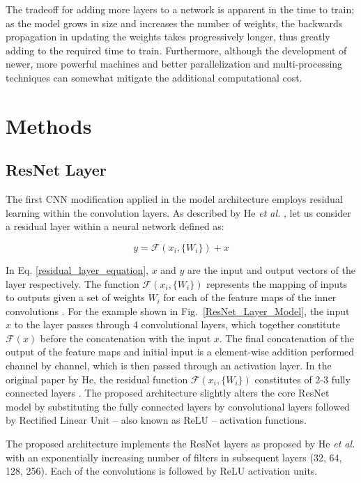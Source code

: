 \documentclass[conference]{IEEEtran}
\begin{document}
The tradeoff for adding more layers to a network is apparent in the time to train; as the model grows in size and increases the number of weights, the backwards propagation in updating the weights takes progressively longer, thus greatly adding to the required time to train. Furthermore, although the development of newer, more powerful machines and better parallelization and multi-processing techniques can somewhat mitigate the additional computational cost.
\section{Methods}
\subsection{ResNet Layer}
The first CNN modification applied in the model architecture employs residual learning within the convolution layers. As described by He \textit{et al.} \cite{He2016}, let us consider a residual layer within a neural network defined as:

\begin{equation}
y = \mathcal{F} \left(x_i,\{W_i\}\right) + x
\label{residual_layer_equation}
\end{equation}

In Eq. \ref{residual_layer_equation}, $x$ and $y$ are the input and output vectors of the layer respectively. The function $\mathcal{F} \left(x_i,\{W_i\}\right)$ represents the mapping of inputs to outputs given a set of weights $W_i$ for each of the feature maps of the inner convolutions \cite{He2016}. For the example shown in Fig.~\ref{ResNet_Layer_Model}, the input $x$ to the layer passes through 4 convolutional layers, which together constitute $\mathcal{F}(x)$ before the concatenation with the input $x$. The final concatenation of the output of the feature maps and initial input is a element-wise addition performed channel by channel, which is then passed through an activation layer. In the original paper by He, the residual function $\mathcal{F} \left(x_i,\{W_i\}\right)$ constitutes of 2-3 fully connected layers \cite{He2016}. The proposed architecture slightly alters the core ResNet model by substituting the fully connected layers by convolutional layers followed by Rectified Linear Unit -- also known as ReLU -- activation functions.

The proposed architecture implements the ResNet layers as proposed by He \emph{et al.} with an exponentially increasing number of filters in subsequent layers (32, 64, 128, 256). Each of the convolutions is followed by ReLU activation units.
\end{document}
